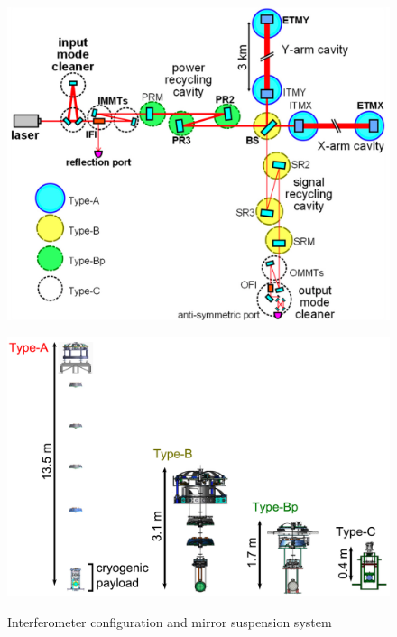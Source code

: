 \begin{figure}[p]
  \begin{minipage}{15cm}
    \begin{center}   
      \includegraphics[width=13cm]{./img_chap6/img601.png}
      \label{img:img601} \hfill\vspace{10pt}
    \end{center}
  \end{minipage}
  \begin{minipage}{15cm}
    \begin{center}   
      \includegraphics[width=13cm]{./img_chap6/img601b.png}
      \label{img:img601b}
    \end{center}
  \end{minipage}
  \caption{Interferometer configuration and mirror suspension system}{}
\end{figure}


